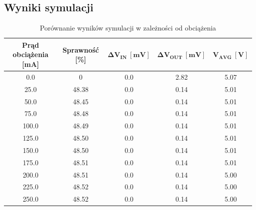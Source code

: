 \documentclass[11pt]{article}
\begin{document}
\subsection{Wyniki symulacji}
\begin{table}[H]
    \centering
    \caption{Porównanie wyników symulacji w zależności od obciążenia}
    \label{tab:efficiency_ripple}
    \begin{tabular}{ccccc}
        \toprule
        \textbf{Prąd obciążenia [mA]} & \textbf{Sprawność [\%]} & $\mathbf{\Delta{V_{IN}} \ [mV]}$ & $\mathbf{\Delta{V_{OUT}} \ [mV]}$ & $\mathbf{V_{AVG} \ [V]}$ \\
        \midrule
        0.0                           & 0                       & 0.0                              & 2.82                              & 5.07                     \\
        25.0                          & 48.38                   & 0.0                              & 0.14                              & 5.01                     \\
        50.0                          & 48.45                   & 0.0                              & 0.14                              & 5.01                     \\
        75.0                          & 48.48                   & 0.0                              & 0.14                              & 5.01                     \\
        100.0                         & 48.49                   & 0.0                              & 0.14                              & 5.01                     \\
        125.0                         & 48.50                   & 0.0                              & 0.14                              & 5.01                     \\
        150.0                         & 48.50                   & 0.0                              & 0.14                              & 5.01                     \\
        175.0                         & 48.51                   & 0.0                              & 0.14                              & 5.01                     \\
        200.0                         & 48.51                   & 0.0                              & 0.14                              & 5.00                     \\
        225.0                         & 48.52                   & 0.0                              & 0.14                              & 5.00                     \\
        250.0                         & 48.52                   & 0.0                              & 0.14                              & 5.00                     \\
        \bottomrule
    \end{tabular}
\end{table}
\end{document}
